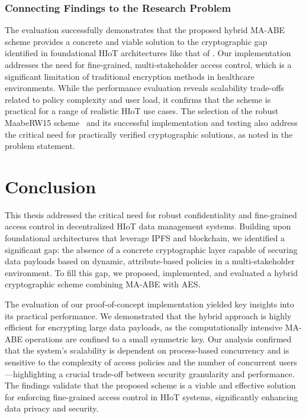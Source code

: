 \documentclass[cic,tc,english]{iiufrgs}
\numberwithin{algorithm}{chapter}
\begin{document}
            \subsection{Connecting Findings to the Research Problem}

                The evaluation successfully demonstrates that the proposed hybrid MA-ABE scheme provides a concrete and viable solution to the cryptographic gap identified in foundational HIoT architectures like that of \citet{laura2023}. Our implementation addresses the need for fine-grained, multi-stakeholder access control, which is a significant limitation of traditional encryption methods in healthcare environments. While the performance evaluation reveals scalability trade-offs related to policy complexity and user load, it confirms that the scheme is practical for a range of realistic HIoT use cases. The selection of the robust MaabeRW15 scheme~\citep{rouselakis2015efficient} and its successful implementation and testing also address the critical need for practically verified cryptographic solutions, as noted in the problem statement.


\chapter{Conclusion}
    \label{chap:conclusion}

    This thesis addressed the critical need for robust confidentiality and fine-grained access control in decentralized HIoT data management systems. Building upon foundational architectures that leverage IPFS and blockchain, we identified a significant gap: the absence of a concrete cryptographic layer capable of securing data payloads based on dynamic, attribute-based policies in a multi-stakeholder environment. To fill this gap, we proposed, implemented, and evaluated a hybrid cryptographic scheme combining MA-ABE with AES.

    The evaluation of our proof-of-concept implementation yielded key insights into its practical performance. We demonstrated that the hybrid approach is highly efficient for encrypting large data payloads, as the computationally intensive MA-ABE operations are confined to a small symmetric key. Our analysis confirmed that the system's scalability is dependent on process-based concurrency and is sensitive to the complexity of access policies and the number of concurrent users—highlighting a crucial trade-off between security granularity and performance. The findings validate that the proposed scheme is a viable and effective solution for enforcing fine-grained access control in HIoT systems, significantly enhancing data privacy and security.
\end{document}
